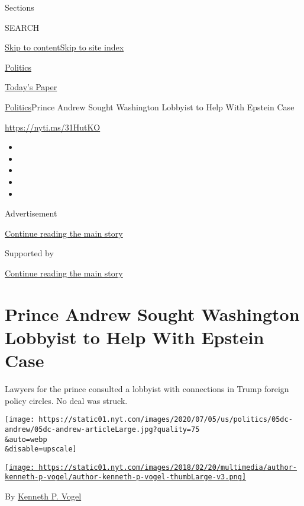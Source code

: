 Sections

SEARCH

\protect\hyperlink{site-content}{Skip to
content}\protect\hyperlink{site-index}{Skip to site index}

\href{https://www.nytimes.com/section/politics}{Politics}

\href{https://myaccount.nytimes.com/auth/login?response_type=cookie\&client_id=vi}{}

\href{https://www.nytimes.com/section/todayspaper}{Today's Paper}

\href{/section/politics}{Politics}\textbar{}Prince Andrew Sought
Washington Lobbyist to Help With Epstein Case

\url{https://nyti.ms/31HutKO}

\begin{itemize}
\item
\item
\item
\item
\item
\end{itemize}

Advertisement

\protect\hyperlink{after-top}{Continue reading the main story}

Supported by

\protect\hyperlink{after-sponsor}{Continue reading the main story}

\hypertarget{prince-andrew-sought-washington-lobbyist-to-help-with-epstein-case}{%
\section{Prince Andrew Sought Washington Lobbyist to Help With Epstein
Case}\label{prince-andrew-sought-washington-lobbyist-to-help-with-epstein-case}}

Lawyers for the prince consulted a lobbyist with connections in Trump
foreign policy circles. No deal was struck.

\texttt{[image: https://static01.nyt.com/images/2020/07/05/us/politics/05dc-andrew/05dc-andrew-articleLarge.jpg?quality=75\\\&auto=webp\\\&disable=upscale]}

\href{https://www.nytimes.com/by/kenneth-p-vogel}{\texttt{[image: https://static01.nyt.com/images/2018/02/20/multimedia/author-kenneth-p-vogel/author-kenneth-p-vogel-thumbLarge-v3.png]}}

By \href{https://www.nytimes.com/by/kenneth-p-vogel}{Kenneth P. Vogel}

